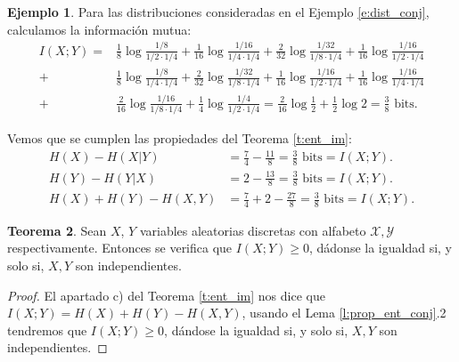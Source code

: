 \documentclass[10pt,a4paper]{article} %
\theoremstyle{definition}
\newtheorem{theorem}{Teorema}[section]
\newtheorem{example}[theorem]{Ejemplo}
\begin{document}
\begin{example}
  Para las distribuciones consideradas en el Ejemplo \ref{e:dist_conj}, calculamos la información mutua:
  \begin{align*}
    I(X;Y) =& \frac{1}{8} \log \frac{1/8}{1/2 \cdot 1/4} + \frac{1}{16} \log \frac{1/16}{1/4 \cdot 1/4} + \frac{2}{32} \log \frac{1/32}{1/8 \cdot 1/4} + \frac{1}{16} \log \frac{1/16}{1/2 \cdot 1/4}\\
    +& \frac{1}{8} \log \frac{1/8}{1/4 \cdot 1/4} + \frac{2}{32} \log \frac{1/32}{1/8 \cdot 1/4} + \frac{1}{16} \log \frac{1/16}{1/2 \cdot 1/4} + \frac{1}{16} \log \frac{1/16}{1/4 \cdot 1/4}\\
    +& \frac{2}{16} \log \frac{1/16}{1/8 \cdot 1/4} + \frac{1}{4} \log \frac{1/4}{1/2 \cdot 1/4} = \frac{2}{16} \log \frac{1}{2} + \frac{1}{2} \log 2 = \frac{3}{8} \text{ bits}.
  \end{align*}

  Vemos que se cumplen las propiedades del Teorema \ref{t:ent_im}:
  \begin{align*}
    H(X) -H(X|Y) &= \frac{7}{4} - \frac{11}{8} = \frac{3}{8} \text{ bits} = I(X;Y).\\
    H(Y) -H(Y|X) &= 2 - \frac{13}{8} = \frac{3}{8} \text{ bits} = I(X;Y).\\
    H(X) + H(Y) - H(X,Y) &= \frac{7}{4} + 2 - \frac{27}{8} = \frac{3}{8} \text{ bits} = I(X;Y).
  \end{align*}
  
\end{example}

\begin{theorem}\label{t:im_indd}
  Sean $X$, $Y$ variables aleatorias discretas con alfabeto $\mathcal{X}, \mathcal{Y}$ respectivamente. Entonces se verifica que $I(X;Y)\ge 0$, dádonse la igualdad si, y solo si, $X,Y$ son independientes.
\end{theorem}
\begin{proof}

El apartado c) del Teorema \ref{t:ent_im} nos dice que $I(X;Y) = H(X)+H(Y)-H(X,Y)$, usando el Lema \ref{l:prop_ent_conj}.2 tendremos que $I(X;Y)\ge 0$, dándose la igualdad si, y solo si, $X,Y$ son independientes.
\end{proof}
\end{document}
